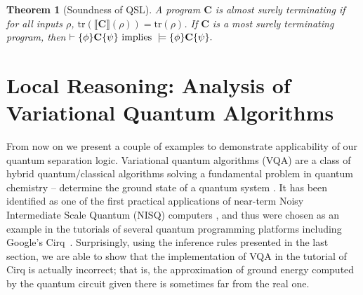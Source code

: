 \documentclass[conference,compsoc, 10pt]{IEEEtran}
\newcommand{\jh}[1]{\textit{\color{red}[JH] : #1}}
\newtheorem{theorem}{Theorem}[section]
\newcommand {\tr } {{\mathrm{tr}}}
\newcommand {\prog } {{\mathbf{C}}}
\newcommand {\sem}[1] {\llbracket#1\rrbracket}
\begin{document}
	\begin{theorem}[Soundness of QSL]
		\label{thm sound QSL}
    A program $\prog$ is \emph{almost surely terminating} if for all inputs
    $\rho$, $\tr(\sem{\prog}(\rho)) = \tr(\rho)$. If $\prog$ is a most surely
    terminating program, then $\vdash\{\phi\}\prog\{\psi\}\ {\rm implies}\
    \models\{\phi\}\prog\{\psi\}.$
	\end{theorem}	
	
	\section{Local Reasoning: Analysis of Variational Quantum Algorithms}\label{sec-vqa-exam}
	
	From now on we present a couple of examples to demonstrate  applicability of our quantum separation logic. 
	Variational quantum algorithms (VQA) are a class of hybrid quantum/classical algorithms solving a fundamental problem in quantum chemistry -- determine the ground state of a quantum system \cite{PMS14,MRB16}. It has been identified as one of the first practical applications of  near-term Noisy Intermediate Scale Quantum (NISQ) computers \cite{Pre18}, and thus were chosen  as an example in the tutorials of several quantum programming platforms including Google's Cirq~\cite{Cirq}. Surprisingly, using the inference rules presented in the last section, we are able to show that the implementation of VQA in the tutorial of Cirq is actually incorrect;  that is, the approximation of ground energy computed by the quantum circuit given there is sometimes far from the real one.
	
\end{document}
